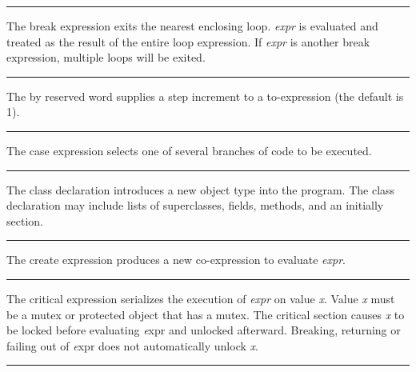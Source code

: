 \bigskip\hrule\vspace{0.1cm}

\noindent
The \textsf{break} expression exits the nearest
enclosing loop. \textit{expr} is evaluated and treated as the result of
the entire loop expression. If \textit{expr} is another
\textsf{break} expression, multiple loops will be exited.

\bigskip\hrule\vspace{0.1cm}

\noindent
{}The \textsf{by} reserved word supplies a step
increment to a \textsf{to}{}-expression (the default is 1).

\bigskip\hrule\vspace{0.1cm}

\noindent
The \textsf{case} expression selects one of
several branches of code to be executed.

\bigskip\hrule\vspace{0.1cm}

\noindent
{}The \textsf{class} declaration introduces a new
object type into the program. The \textsf{class} declaration may
include lists of superclasses, fields, methods, and an
initially section.

\bigskip\hrule\vspace{0.1cm}

\noindent
{}The \textsf{create} expression produces a new
co-expression to evaluate \textit{expr}.

\bigskip\hrule\vspace{0.1cm}

\noindent
{}The \textsf{critical} expression serializes the
execution of \textit{expr} on value {\textit x}. Value {\textit x} must
be a mutex or protected object that has a mutex. The critical section
causes {\textit x} to be locked before evaluating {\textit expr} and
unlocked afterward. Breaking, returning or failing out of {\textit expr} 
does not automatically unlock {\textit x}.

\bigskip\hrule\vspace{0.1cm}

